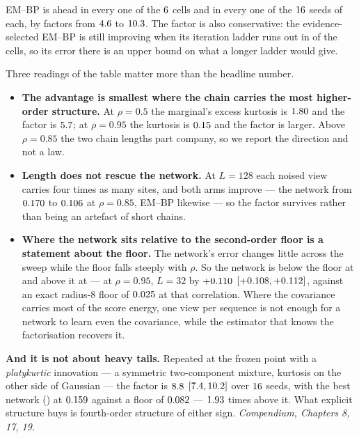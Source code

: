 \documentclass[11pt,a4paper]{article}
\newcommand{\corr}{\rho}
\newcommand{\nsites}{L}
\newcommand{\hi}[1]{\textbf{#1}}
\newcommand{\comp}[1]{{\small\textit{Compendium, #1.}}}
\begin{document}
\noindent
EM--BP is ahead in every one of the $6$ cells and in every one of the $16$ seeds of
each, by factors from $4.6$ to $10.3$. The
factor is also conservative: the evidence-selected EM--BP is still improving when its iteration
ladder runs out in \rbEmEvAtCapTotal{} of the cells, so its error there is an upper bound on what
a longer ladder would give.

Three readings of the table matter more than the headline number.

\begin{itemize}
\item \hi{The advantage is smallest where the chain carries the most higher-order structure.}
At $\corr=0.5$ the marginal's excess kurtosis is $1.80$ and the factor is
$5.7$; at $\corr=0.95$ the kurtosis is $0.15$ and the
factor is larger. Above $\corr=0.85$ the two chain lengths part company, so we report the direction
and not a law.

\item \hi{Length does not rescue the network.} At $\nsites=128$ each noised view carries four times
as many sites, and both arms improve --- the network from $0.170$ to
$0.106$ at $\corr=0.85$, EM--BP likewise --- so the factor survives
rather than being an artefact of short chains.

\item \hi{Where the network sits relative to the second-order floor is a statement about the
floor.} The network's error changes little across the sweep while the floor falls steeply with
$\corr$. So the network is below the floor at \rbIsmBelowFloorCells{} and above it at
\rbIsmAboveFloorCells{} --- at $\corr=0.95$, $\nsites=32$ by
$+0.110$
$[+0.108,+0.112]$, against an exact
radius-$8$ floor of $0.025$ at that correlation. Where the covariance
carries most of the score energy, one view per sequence is not enough for a network to learn even
the covariance, while the estimator that knows the factorisation recovers it.
\end{itemize}

\noindent
\hi{And it is not about heavy tails.} Repeated at the frozen point with a \emph{platykurtic}
innovation --- a symmetric two-component mixture, kurtosis on the other side of Gaussian --- the
factor is $8.8$
$[7.4,10.2]$ over
$16$ seeds, with the best network (\rbBimodalIsmBestArcheightfivethirtytwo) at
$0.159$ against a floor of $0.082$ ---
$1.93$ times above it. What explicit structure buys is
fourth-order structure of either sign.
\comp{Chapters 8, 17, 19}
\end{document}

